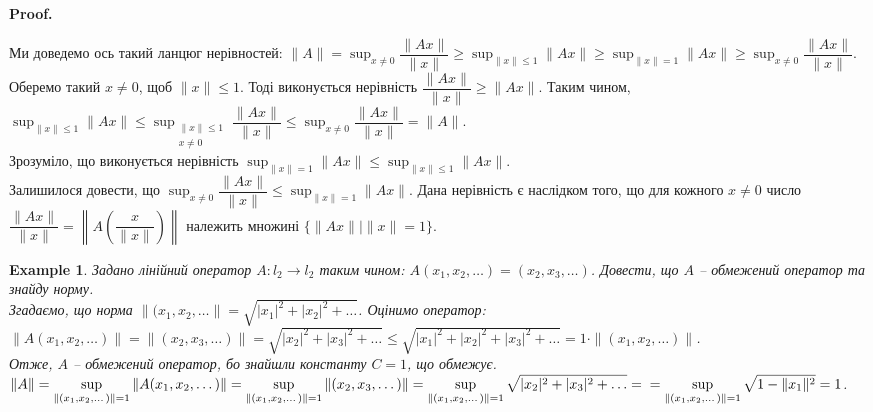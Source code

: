 \documentclass[a4paper, 10pt]{article}
\makeatletter
\theoremstyle{theoremdd}
\theoremstyle{theoremdd}
\theoremstyle{theoremdd}
\theoremstyle{theoremdd}
\newtheorem{example}[theorem]{Example}
\theoremstyle{theoremdd}
\theoremstyle{theoremdd}
\theoremstyle{theoremdd}
\theoremstyle{theoremdd}
\renewenvironment{proof}[1][Proof.\\]{\par
\pushQED{\hfill \qed}%
\normalfont \topsep6\p@\@plus6\p@\relax
\trivlist
\item\relax
{\bfseries
#1\@addpunct{.}}\hspace\labelsep\ignorespaces
}{%
\popQED\endtrivlist\@endpefalse
}
\makeatother
\begin{document}
\begin{proof}
Ми доведемо ось такий ланцюг нерівностей: $\|A\| = \displaystyle\sup_{x \neq 0} \dfrac{\|Ax\|}{\|x\|} \geq \sup_{\|x\|\leq 1} \|Ax\| \geq \sup_{\|x\| = 1} \|Ax\| \geq \sup_{x \neq 0} \dfrac{\|Ax\|}{\|x\|}$.\\
Оберемо такий $x \neq 0$, щоб $\|x\| \leq 1$. Тоді виконується нерівність $\dfrac{\|Ax\|}{\|x\|} \geq \|A x\|$. Таким чином, $\displaystyle\sup_{\|x\| \leq 1} \|Ax\| \leq \sup_{\substack{\|x\| \leq 1 \\ x \neq 0 }} \dfrac{\|Ax\|}{\|x\|} \leq \sup_{x \neq 0} \dfrac{\|Ax\|}{\|x\|} = \|A\|$.\\
Зрозуміло, що виконується нерівність $\displaystyle\sup_{\|x\| = 1} \|Ax\| \leq \sup_{\|x\| \leq 1} \|Ax\|$.\\
Залишилося довести, що $\displaystyle\sup_{x \neq 0} \dfrac{\|Ax\|}{\|x\|} \leq \sup_{\|x\|=  1} \|Ax\|$. Дана нерівність є наслідком того, що для кожного $x \neq 0$ число $\dfrac{\|Ax\|}{\|x\|} = \left\| A \left( \dfrac{x}{\|x\|} \right) \right\|$ належить множині $\{ \|Ax\| \mid \|x\| = 1\}$.
\end{proof}

\begin{example}
Задано лінійний оператор $A \colon l_2 \to l_2$ таким чином: $A(x_1,x_2,\dots) = (x_2,x_3,\dots)$. Довести, що $A$ -- обмежений оператор та знайду норму.\\
Згадаємо, що норма $\|(x_1,x_2,\dots\| = \sqrt{|x_1|^2 + |x_2|^2 + \dots}$. Оцінимо оператор:\\
$\|A (x_1,x_2,\dots)\| = \|(x_2,x_3,\dots)\| = \sqrt{|x_2|^2 + |x_3|^2 + \dots} \leq \sqrt{|x_1|^2 + |x_2|^2 + |x_3|^2 + \dots} = 1 \cdot \|(x_1,x_2,\dots)\|$.\\
Отже, $A$ -- обмежений оператор, бо знайшли константу $C = 1$, що обмежує.\\
$\|A\| = \displaystyle\sup_{\|(x_1,x_2,\dots)\| = 1} \|A(x_1,x_2,\dots)\| = \displaystyle\sup_{\|(x_1,x_2,\dots)\| = 1} \|(x_2,x_3,\dots)\| = \sup_{\|(x_1,x_2,\dots)\| = 1} \sqrt{|x_2|^2 + |x_3|^2 + \dots} = \\
= \sup_{\|(x_1,x_2,\dots)\| = 1} \sqrt{1 - \|x_1\|^2} = 1$.
\end{example}
\end{document}

